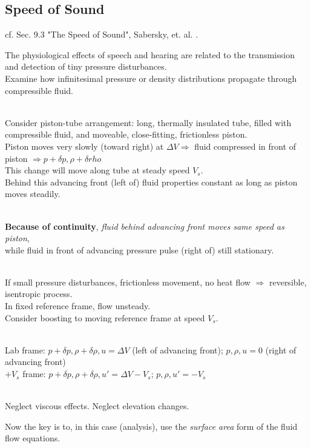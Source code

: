 \documentclass[twoside,landscape,10pt]{amsart}
\theoremstyle{plain}
\theoremstyle{definition}
\theoremstyle{remark}
\theoremstyle{remark}
\begin{document}
\begin{multicols*}{2}
\subsection{Speed of Sound}

cf. Sec. 9.3 "The Speed of Sound", Sabersky, et. al. \cite{SAHG1998}.

The physiological effects of speech and hearing are related to the transmission and detection of tiny pressure disturbances. \\
Examine how infinitesimal pressure or density distributions propagate through compressible fluid. 

\quad \\ 
Consider piston-tube arrangement: long, thermally insulated tube, filled with compressible fluid, and moveable, close-fitting, frictionless piston. \\
Piston moves very slowly (toward right) at $\Delta V \Longrightarrow$ fluid compressed in front of piston $\Longrightarrow p + \delta p , \rho + \delta rho$ \\
This change will move along tube at steady speed $V_s$. \\
Behind this advancing front (left of) fluid properties constant as long as piston moves steadily. 

\quad \\ 
\textbf{Because of continuity}, \emph{fluid behind advancing front moves same speed as piston}, \\
while fluid in front of advancing pressure pulse (right of) still stationary.

\quad \\
If small pressure disturbances, frictionless movement, no heat flow $\Longrightarrow $ reversible, isentropic process. \\
In fixed reference frame, flow unsteady. \\
Consider boosting to moving reference frame at speed $V_s$.  

\quad \\ 
Lab frame: $p + \delta p, \rho + \delta \rho, u = \Delta V$ (left of advancing front); $p, \rho, u = 0$ (right of advancing front) \\
$+V_s$ frame: $p+\delta p, \rho + \delta \rho, u' = \Delta V- V_s$; $p, \rho, u' = -V_s$

\quad \\ 
Neglect viscous effects. Neglect elevation changes.

Now the key is to, in this case (analysis), use the \emph{surface area} form of the fluid flow equations.


\end{multicols*}
\end{document}
